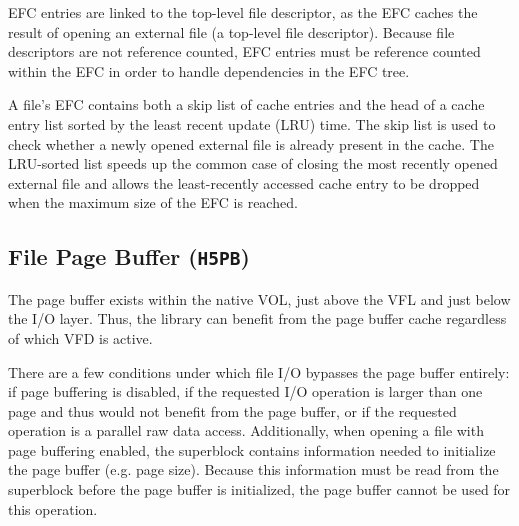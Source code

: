 \begin{itemize}
EFC entries are linked to the top-level file descriptor, as the EFC caches the result of opening an external file (a top-level file descriptor). Because file descriptors are not reference counted, EFC entries must be reference counted within the EFC in order to handle dependencies in the EFC tree.

A file's EFC contains both a skip list of cache entries and the head of a cache entry list sorted by the least recent update (LRU) time. The skip list is used to check whether a newly opened external file is already present in the cache. The LRU-sorted list speeds up the common case of closing the most recently opened external file and allows the least-recently accessed cache entry to be dropped when the maximum size of the EFC is reached.

\end{itemize}


\subsection{File Page Buffer (\texttt{H5PB})}\label{sec:H5PB}



The page buffer exists within the native VOL, just above the VFL and just below the I/O layer. Thus, the library can benefit from the page buffer cache regardless of which VFD is active.

There are a few conditions under which file I/O bypasses the page buffer entirely: if page buffering is disabled, if the requested I/O operation is larger than one page and thus would not benefit from the page buffer, or if the requested operation is a parallel raw data access. Additionally, when opening a file with page buffering enabled, the superblock contains information needed to initialize the page buffer (e.g. page size). Because this information must be read from the superblock before the page buffer is initialized, the page buffer cannot be used for this operation.

